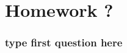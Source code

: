 \documentclass[12pt]{article}
\begin{document}


\section*{Homework ?}
\subsubsection*{type first question here}


\end{document}
